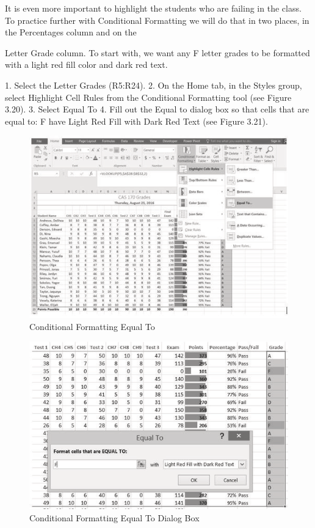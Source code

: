 It is even more important to highlight the students who are failing in the class. To practice further
with Conditional Formatting we will do that in two places, in the Percentages column and on the



Letter Grade column. To start with, we want any F letter grades to be formatted with a light red fill
color and dark red text.

1. Select the Letter Grades (R5:R24).
2. On the Home tab, in the Styles group, select Highlight Cell Rules from the Conditional
Formatting tool (see Figure 3.20).
3. Select Equal To
4. Fill out the Equal to dialog box so that cells that are equal to: F have Light Red Fill with Dark
Red Text (see Figure 3.21).



\begin{figure}[H]
	\centering
	\includegraphics[width=\maxwidth{.95\linewidth}]{gfx/ch03_fig20}
	\caption{Conditional Formatting Equal To}
	\label{03:fig20}
\end{figure}


\begin{figure}[H]
	\centering
	\includegraphics[width=\maxwidth{.95\linewidth}]{gfx/ch03_fig21}
	\caption{Conditional Formatting Equal To Dialog Box}
	\label{03:fig21}
\end{figure}




